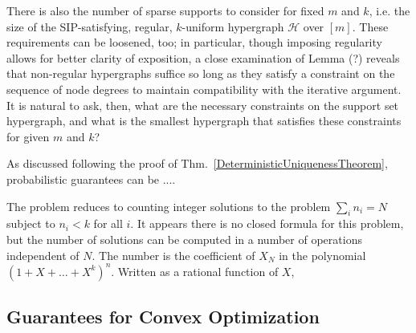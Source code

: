 There is also the number of sparse supports to consider for fixed $m$ and $k$, i.e. the size of the SIP-satisfying, regular, $k$-uniform hypergraph $\mathcal{H}$ over $[m]$. These requirements can be loosened, too; in particular, though imposing regularity allows for better clarity of exposition, a close examination of Lemma (?) reveals that non-regular hypergraphs suffice so long as they satisfy a constraint on the sequence of node degrees to maintain compatibility with the iterative argument. It is natural to ask, then, what are the necessary constraints on the support set hypergraph, and what is the smallest hypergraph that satisfies these constraints for given $m$ and $k$? 

As discussed following the proof of Thm.~\ref{DeterministicUniquenessTheorem}, probabilistic guarantees can be .... 

The problem reduces to counting integer solutions to the problem $\sum_i n_i = N$ subject to $n_i < k$ for all $i$. It appears there is no closed formula for this problem, but the number of solutions can be computed in a number of operations independent of $N$. The number is the coefficient of $X_N$ in the polynomial $(1 + X + \ldots + X^k)^n$. Written as a rational function of $X$, 


\subsection{Guarantees for Convex Optimization}

